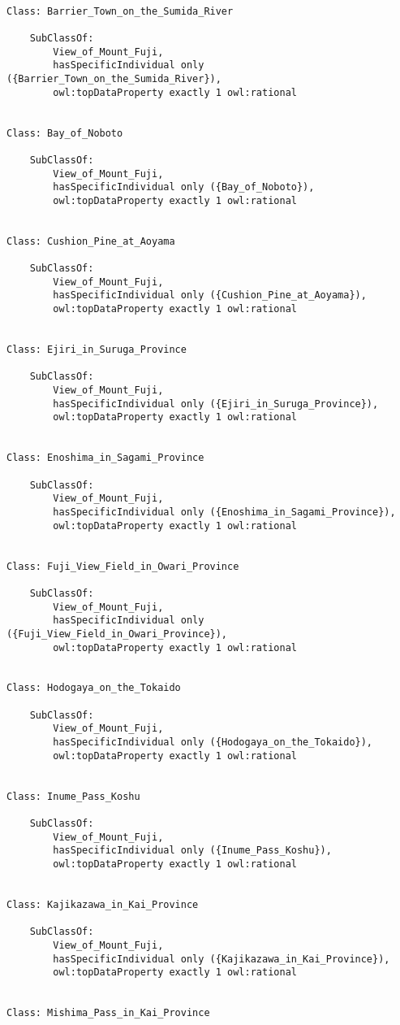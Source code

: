 \documentclass[titlepage,a4paper,12pt,oneside]{book}
\begin{document}
\begin{appendices}
\begin{lstlisting}
    
Class: Barrier_Town_on_the_Sumida_River

    SubClassOf: 
        View_of_Mount_Fuji,
        hasSpecificIndividual only ({Barrier_Town_on_the_Sumida_River}),
        owl:topDataProperty exactly 1 owl:rational
    
    
Class: Bay_of_Noboto

    SubClassOf: 
        View_of_Mount_Fuji,
        hasSpecificIndividual only ({Bay_of_Noboto}),
        owl:topDataProperty exactly 1 owl:rational
    
    
Class: Cushion_Pine_at_Aoyama

    SubClassOf: 
        View_of_Mount_Fuji,
        hasSpecificIndividual only ({Cushion_Pine_at_Aoyama}),
        owl:topDataProperty exactly 1 owl:rational
    
    
Class: Ejiri_in_Suruga_Province

    SubClassOf: 
        View_of_Mount_Fuji,
        hasSpecificIndividual only ({Ejiri_in_Suruga_Province}),
        owl:topDataProperty exactly 1 owl:rational
    
    
Class: Enoshima_in_Sagami_Province

    SubClassOf: 
        View_of_Mount_Fuji,
        hasSpecificIndividual only ({Enoshima_in_Sagami_Province}),
        owl:topDataProperty exactly 1 owl:rational
    
    
Class: Fuji_View_Field_in_Owari_Province

    SubClassOf: 
        View_of_Mount_Fuji,
        hasSpecificIndividual only ({Fuji_View_Field_in_Owari_Province}),
        owl:topDataProperty exactly 1 owl:rational
    
    
Class: Hodogaya_on_the_Tokaido

    SubClassOf: 
        View_of_Mount_Fuji,
        hasSpecificIndividual only ({Hodogaya_on_the_Tokaido}),
        owl:topDataProperty exactly 1 owl:rational
    
    
Class: Inume_Pass_Koshu

    SubClassOf: 
        View_of_Mount_Fuji,
        hasSpecificIndividual only ({Inume_Pass_Koshu}),
        owl:topDataProperty exactly 1 owl:rational
    
    
Class: Kajikazawa_in_Kai_Province

    SubClassOf: 
        View_of_Mount_Fuji,
        hasSpecificIndividual only ({Kajikazawa_in_Kai_Province}),
        owl:topDataProperty exactly 1 owl:rational
    
    
Class: Mishima_Pass_in_Kai_Province


\end{lstlisting}
\end{appendices}
\end{document}
